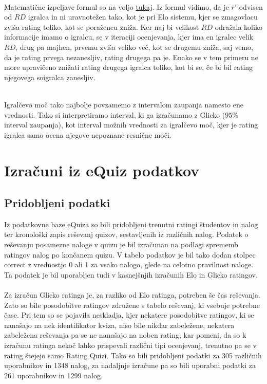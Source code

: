 \documentclass{IEEEtran}
\makeatletter
\let\old@subsection\subsection
\renewcommand{\subsection}[1]{\bigskip\old@subsection{#1}\@afterindentfalse\@afterheading}
\makeatother
\begin{document}
\hfill
\\
Matematične izpeljave formul so na voljo \href{http://www.glicko.net/research/glicko.pdf}{tukaj}. %
\newpage
Iz formul vidimo, da je $r'$ odvisen od $RD$ igralca in ni uravnotežen tako, kot je pri Elo sistemu, kjer se zmagovlacu zviša rating toliko, kot se poražencu zniža. Ker naj bi velikost $RD$ odražala koliko informacije imamo o igralcu, se v iteraciji ocenjevanja, kjer ima en igralec velik $RD$, drug pa majhen, prvemu zviša veliko več, kot se drugemu zniža, saj vemo, da je rating prvega nezanesljiv, rating drugega pa je. Enako se v tem primeru ne more upravičeno znižati rating drugega igralca toliko, kot bi se, če bi bil rating njegovega soigralca zanesljiv.

\hfill
\\
Igralčevo moč tako najbolje povzamemo z intervalom zaupanja namesto ene vrednosti. Tako si interpretiramo interval, ki ga izračunamo z Glicko ($95\%$ interval zaupanja), kot interval možnih vrednosti za igralčevo moč, kjer je rating igralca samo ocena njegove nepoznane resnične moči.

\hfill

\section{Izračuni iz eQuiz podatkov}
\label{sec:equiz}

\subsection{Pridobljeni podatki}
Iz podatkovne baze eQuiza so bili pridobljeni trenutni ratingi študentov in nalog ter kronološki zapis reševanj quizov, sestavljenih iz različnih nalog. Podatek o reševanju posamezne naloge v quizu je bil izračunan na podlagi sprememb ratingov nalog po končanem quizu. V tabelo podatkov je bil tako dodan stolpec correct z vrednostjo 0 ali 1 za vsako nalogo, glede na celotno pravilnost naloge. Ta podatek je bil uporabljen tudi v kasnejšnjih izračunih Elo in Glicko ratingov.
\hfill
\\
\\
Za izračun Glicko ratinga je, za razliko od Elo ratinga, potreben še čas reševanja. Zato so bile posodobitve ratingov združene s tabelo reševanj, ki vsebuje potrebne čase. Pri tem so se pojavila neskladja, kjer nekatere posodobitve ratingov, ki se nanašajo na nek identifikator kviza, niso bile nikdar zabeležene, nekatera zabeležena reševanja pa se ne nanašajo na noben rating, kar pomeni, da so k izračunu ratinga nekoč lahko prispevali različni tipi ocenjevanj, trenutno pa se v rating štejejo samo Rating Quizi. Tako so bili pridobljeni podatki za 305 različnih uporabnikov in 1348 nalog, za nadaljnje izračune pa so bili uporabni podatki za 261 uporabnikov in 1299 nalog.
\\
\end{document}
